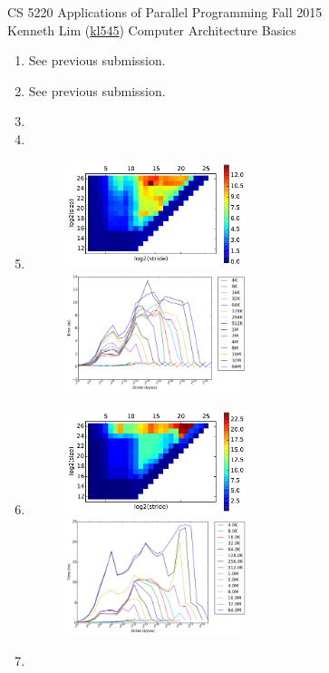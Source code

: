 \documentclass{scrartcl}
\begin{document}
  \begin{framed}
  \large
  CS 5220 Applications of Parallel Programming \hfill Fall 2015 \\
  Kenneth Lim (\href{mailto:kl545@cornell.edu}{kl545}) \hfill Computer Architecture Basics \hspace{-3ex}
  \end{framed}
  \begin{enumerate}
    \item See previous submission.
    \item See previous submission.
    \item
    \item
    \item
      \begin{figure}[ht!]
        \centering
        \includegraphics[width=0.5\textwidth]{local-timings-heat}
        \includegraphics[width=0.5\textwidth]{local-timings-line}
      \end{figure}
    \item
    \begin{figure}[ht!]
      \centering
      \includegraphics[width=0.5\textwidth]{totient-timings-heat}
      \includegraphics[width=0.5\textwidth]{totient-timings-line}
    \end{figure}
    \item
  \end{enumerate}
\end{document}
